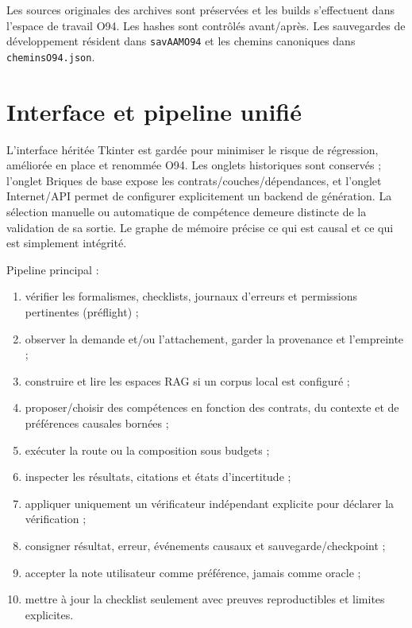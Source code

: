 \documentclass[11pt,a4paper]{article}
\begin{document}
Les sources originales des archives sont préservées et les builds s'effectuent dans l'espace de travail O94. Les hashes sont contrôlés avant/après. Les sauvegardes de développement résident dans \texttt{sav\textunderscore AAM\textunderscore O94} et les chemins canoniques dans \texttt{chemins\textunderscore O94.json}.

\section{Interface et pipeline unifié}
L'interface héritée Tkinter est gardée pour minimiser le risque de régression, améliorée en place et renommée O94. Les onglets historiques sont conservés ; l'onglet Briques de base expose les contrats/couches/dépendances, et l'onglet Internet/API permet de configurer explicitement un backend de génération. La sélection manuelle ou automatique de compétence demeure distincte de la validation de sa sortie. Le graphe de mémoire précise ce qui est causal et ce qui est simplement intégrité.

Pipeline principal :
\begin{enumerate}
\item vérifier les formalismes, checklists, journaux d'erreurs et permissions pertinentes (préflight) ;
\item observer la demande et/ou l'attachement, garder la provenance et l'empreinte ;
\item construire et lire les espaces RAG si un corpus local est configuré ;
\item proposer/choisir des compétences en fonction des contrats, du contexte et de préférences causales bornées ;
\item exécuter la route ou la composition sous budgets ;
\item inspecter les résultats, citations et états d'incertitude ;
\item appliquer uniquement un vérificateur indépendant explicite pour déclarer la vérification ;
\item consigner résultat, erreur, événements causaux et sauvegarde/checkpoint ;
\item accepter la note utilisateur comme préférence, jamais comme oracle ;
\item mettre à jour la checklist seulement avec preuves reproductibles et limites explicites.
\end{enumerate}
\end{document}
